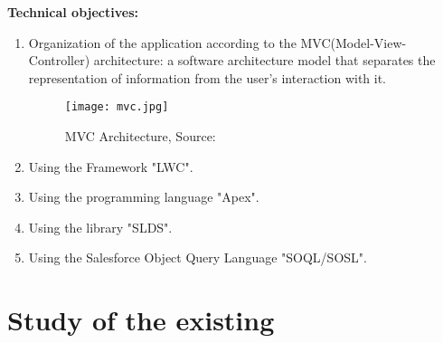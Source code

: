 \textbf{Technical objectives:}
\begin{enumerate}
\item Organization of the application according to the MVC(Model-View-Controller) architecture: a software architecture model that separates the representation of information from the user's interaction with it.

\begin{figure}[H]%
    \center   
    \texttt{[image: mvc.jpg]}
    \caption{MVC Architecture, Source: \cite{6}}
\end{figure}

\item Using the Framework "LWC".
\item Using the programming language "Apex".
\item Using the library "SLDS".
\item Using the Salesforce Object Query Language "SOQL/SOSL".

\end{enumerate}
\section{Study of the existing}


